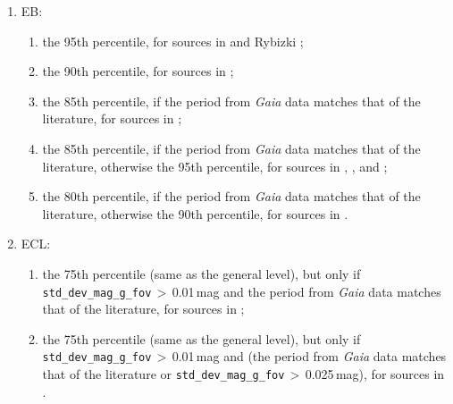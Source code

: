 \documentclass[longauth]{aa}
\def\gaia{\textit{Gaia}\xspace}
\begin{document}
\begin{appendix}
\begin{enumerate}
\begin{enumerate}
\begin{enumerate}
 \item the 80th percentile, if the period from \gaia data matches that of the literature, otherwise the 95th percentile, for sources in \citet{2018MNRAS.477.3145J,2019MNRAS.486.1907J,2019MNRAS.485..961J} and \citet{2006SASS...25...47W};
 \item \texttt{skewness\_mag\_g\_fov}\,$>$\,0.9, for sources in \citet{2020ApJS..249...18C}, \citet{1997ESASP1200.....E}, \citet{2016AJ....151...68K}, \citet{2018MNRAS.477.3145J,2019MNRAS.486.1907J,2019MNRAS.485..961J},  \citet{2014ApJS..213....9D,2017MNRAS.469.3688D}, \citet{2013AJ....146..101P}, \citet{2009AcA....59...33P}, Rybizki \citep[catalogue GAIA\_ECL\_RYBIZKI\_2018 in][]{DR3-DPACP-177},  and \citet{2006SASS...25...47W}.
 \end{enumerate}
    \item EB: 
 \begin{enumerate}
  \item the 95th percentile, for sources in \citet{2014ApJS..213....9D} and Rybizki \citep[catalogue GAIA\_ECL\_RYBIZKI\_2018 in][]{DR3-DPACP-177};
  \item the 90th percentile, for sources in \citet{2013AcA....63..323P};
  \item the 85th percentile, if the period from \gaia data matches that of the literature, for sources in \citet{2016AJ....151...68K};
  \item the 85th percentile, if the period from \gaia data matches that of the literature, otherwise the 95th percentile, for sources in \citet{2018MNRAS.477.3145J,2019MNRAS.486.1907J,2019MNRAS.485..961J}, \citet{2002AcA....52..397P}, and \citet{2006SASS...25...47W};
  \item the 80th percentile, if the period from \gaia data matches that of the literature, otherwise the 90th percentile, for sources in \citet{1997ESASP1200.....E}.
  \end{enumerate}
    \item ECL: 
    \begin{enumerate}
      \item the 75th percentile (same as the general level), but only if \texttt{std\_dev\_mag\_g\_fov}\,$>$\,0.01\,mag and the period from \gaia data matches that of the literature, for sources in \citet{2006SASS...25...47W};
     \item the 75th percentile (same as the general level), but only if \texttt{std\_dev\_mag\_g\_fov}\,$>$\,0.01\,mag and (the period from \gaia data matches that of the literature or \texttt{std\_dev\_mag\_g\_fov}\,$>$\,0.025\,mag), for sources in \citet{2012AcA....62..219S}.

\end{enumerate}
\end{enumerate}
\end{enumerate}
\end{appendix}
\end{document}
